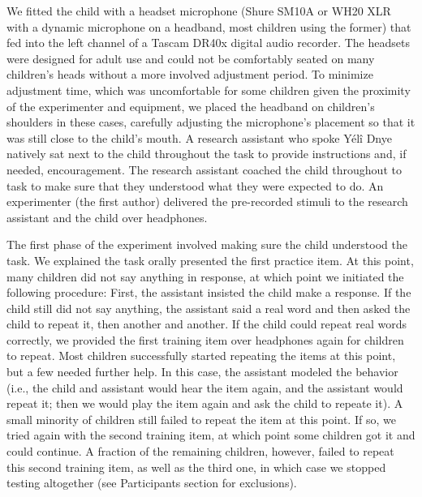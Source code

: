 \documentclass[english,,man,floatsintext]{apa6}
\begin{document}
We fitted the child with a headset microphone (Shure SM10A or WH20 XLR
with a dynamic microphone on a headband, most children using the former)
that fed into the left channel of a Tascam DR40x digital audio recorder.
The headsets were designed for adult use and could not be comfortably
seated on many children's heads without a more involved adjustment
period. To minimize adjustment time, which was uncomfortable for some
children given the proximity of the experimenter and equipment, we
placed the headband on children's shoulders in these cases, carefully
adjusting the microphone's placement so that it was still close to the
child's mouth. A research assistant who spoke Yélî Dnye natively sat
next to the child throughout the task to provide instructions and, if
needed, encouragement. The research assistant coached the child
throughout to task to make sure that they understood what they were
expected to do. An experimenter (the first author) delivered the
pre-recorded stimuli to the research assistant and the child over
headphones.

The first phase of the experiment involved making sure the child
understood the task. We explained the task orally presented the first
practice item. At this point, many children did not say anything in
response, at which point we initiated the following procedure: First,
the assistant insisted the child make a response. If the child still did
not say anything, the assistant said a real word and then asked the
child to repeat it, then another and another. If the child could repeat
real words correctly, we provided the first training item over
headphones again for children to repeat. Most children successfully
started repeating the items at this point, but a few needed further
help. In this case, the assistant modeled the behavior (i.e., the child
and assistant would hear the item again, and the assistant would repeat
it; then we would play the item again and ask the child to repeate it).
A small minority of children still failed to repeat the item at this
point. If so, we tried again with the second training item, at which
point some children got it and could continue. A fraction of the
remaining children, however, failed to repeat this second training item,
as well as the third one, in which case we stopped testing altogether
(see Participants section for exclusions).
\end{document}
